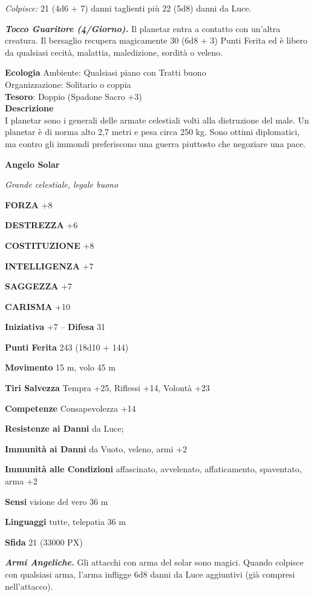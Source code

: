 \begin{multicols}{2}
\textit{Colpisce:} 21 (4d6 + 7) danni taglienti più 22 (5d8) danni da Luce.

\textit{\textbf{Tocco Guaritore (4/Giorno).}} Il planetar entra a contatto con un'altra creatura. Il bersaglio recupera magicamente 30 (6d8 + 3) Punti Ferita ed è libero da qualsiasi cecità, malattia, maledizione, sordità o veleno.

\textbf{Ecologia}
Ambiente: Qualsiasi piano con Tratti buono\\
Organizzazione: Solitario o coppia\\
\textbf{Tesoro}: Doppio (Spadone Sacro +3)\\
\textbf{Descrizione}\\
I planetar sono i generali delle armate celestiali volti alla distruzione del male. Un planetar è di norma alto 2,7 metri e pesa circa 250 kg. Sono ottimi diplomatici, ma contro gli immondi preferiscono una guerra piuttosto che negoziare una pace.


\medskip{}\textbf{Angelo Solar}

\textit{Grande celestiale, legale buono}

\textbf{FORZA} +8

\textbf{DESTREZZA} +6

\textbf{COSTITUZIONE} +8

\textbf{INTELLIGENZA} +7

\textbf{SAGGEZZA} +7

\textbf{CARISMA} +10

\textbf{Iniziativa} +7 -- \textbf{Difesa} 31

\textbf{Punti Ferita} 243 (18d10 + 144)

\textbf{Movimento} 15 m, volo 45 m

\textbf{Tiri Salvezza} Tempra +25, Riflessi +14, Volontà +23

\textbf{Competenze} Consapevolezza +14

\textbf{Resistenze ai Danni} da Luce;

\textbf{Immunità ai Danni} da Vuoto, veleno, armi +2

\textbf{Immunità alle Condizioni} affascinato, avvelenato, affaticamento, spaventato, arma +2

\textbf{Sensi} visione del vero 36 m

\textbf{Linguaggi} tutte, telepatia 36 m

\textbf{Sfida} 21 (33000 PX)

\textit{\textbf{Armi Angeliche.}} Gli attacchi con arma del solar sono magici. Quando colpisce con qualsiasi arma, l'arma infligge 6d8 danni da Luce aggiuntivi (già compresi nell'attacco).


\end{multicols}
